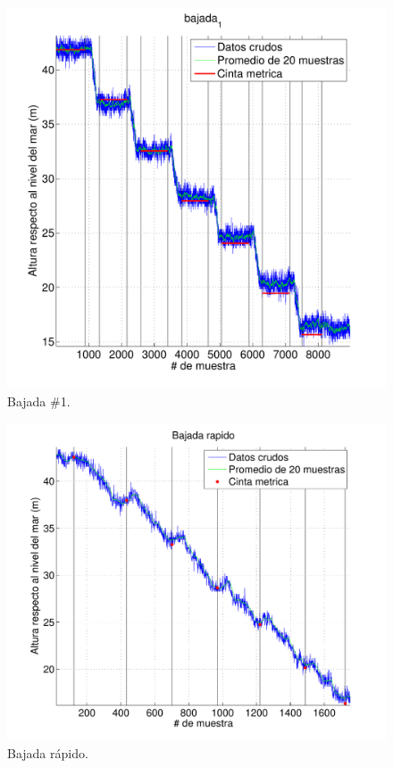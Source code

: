 \documentclass[spanish,12pt,a4paper,titlepage]{report}
\begin{document}
\newpage
\vspace{-20pt}
\begin{figure}[h!]
\centering
  \includegraphics[width=.85\textwidth]{./pics/metros-b1.pdf}
\vspace{-25pt}
  \caption{Bajada \#1.}
  \label{fig:metros-b1.pdf}
\end{figure}
\vspace{-20pt}
\begin{figure}[h!]
\centering
  \includegraphics[width=.85\textwidth]{./pics/metros-rapido.pdf}
\vspace{-15pt}
  \caption{Bajada rápido.}
  \label{fig:metros-rapido.pdf}
\vspace{-15pt}
\end{figure}
\vspace{-15pt}
\end{document}

